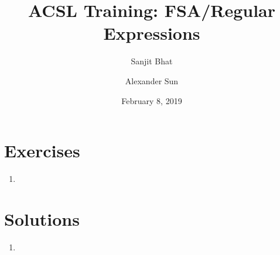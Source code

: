 \documentclass[11pt,letterpaper]{article}
\title{ACSL Training: FSA/Regular Expressions}
\author{Sanjit Bhat \and Alexander Sun}
\date{February 8, 2019}
\begin{document}
    \maketitle

    \section{Exercises}
    \begin{enumerate}
        \item
    \end{enumerate}

    \newpage
    \section{Solutions}
    \begin{enumerate}
        \item
    \end{enumerate}
\end{document}
